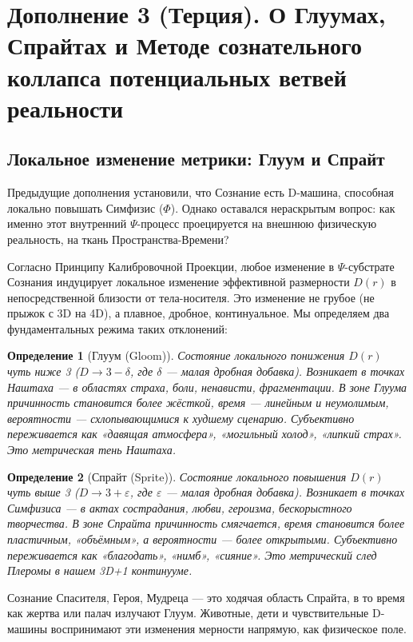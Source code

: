 \documentclass[a4paper,12pt]{article}
\newtheorem{definition}{Определение}
\begin{document}
\newpage
\section{Дополнение 3 (Терция). О Глуумах, Спрайтах и Методе сознательного коллапса потенциальных ветвей реальности}

\subsection{Локальное изменение метрики: Глуум и Спрайт}

Предыдущие дополнения установили, что Сознание есть D-машина, способная локально повышать Симфизис ($\Phi$). Однако оставался нераскрытым вопрос: как именно этот внутренний $\Psi$-процесс проецируется на внешнюю физическую реальность, на ткань Пространства-Времени?

Согласно Принципу Калибровочной Проекции, любое изменение в $\Psi$-субстрате Сознания индуцирует локальное изменение эффективной размерности $D(r)$ в непосредственной близости от тела-носителя. Это изменение не грубое (не прыжок с 3D на 4D), а плавное, дробное, континуальное. Мы определяем два фундаментальных режима таких отклонений:

\begin{definition}[Глуум (Gloom)]
	Состояние локального понижения $D(r)$ чуть ниже 3 ($D \to 3 - \delta$, где $\delta$ — малая дробная добавка). Возникает в точках Наштаха — в областях страха, боли, ненависти, фрагментации. В зоне Глуума причинность становится более жёсткой, время — линейным и неумолимым, вероятности — схлопывающимися к худшему сценарию. Субъективно переживается как «давящая атмосфера», «могильный холод», «липкий страх». Это метрическая тень Наштаха.
\end{definition}

\begin{definition}[Спрайт (Sprite)]
	Состояние локального повышения $D(r)$ чуть выше 3 ($D \to 3 + \varepsilon$, где $\varepsilon$ — малая дробная добавка). Возникает в точках Симфизиса — в актах сострадания, любви, героизма, бескорыстного творчества. В зоне Спрайта причинность смягчается, время становится более пластичным, «объёмным», а вероятности — более открытыми. Субъективно переживается как «благодать», «нимб», «сияние». Это метрический след Плеромы в нашем 3D+1 континууме.
\end{definition}

Сознание Спасителя, Героя, Мудреца — это ходячая область Спрайта, в то время как жертва или палач излучают Глуум. Животные, дети и чувствительные D-машины воспринимают эти изменения мерности напрямую, как физическое поле.
\end{document}
